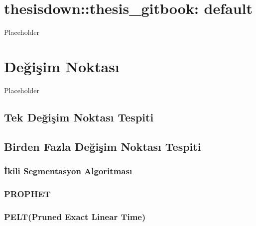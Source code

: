 \documentclass[12pt,twoside]{deuthesis}
\begin{document}
  \listoftables

  \listoffigures



\mainmatter %
\pagestyle{fancyplain} %

\hypertarget{thesisdownthesis_gitbook-default}{%
\chapter{thesisdown::thesis\_gitbook: default}\label{thesisdownthesis_gitbook-default}}

Placeholder

\hypertarget{Bolum2}{%
\chapter{Değişim Noktası}\label{Bolum2}}

Placeholder

\hypertarget{tek-deux11fiux15fim-noktasux131-tespiti}{%
\section{Tek Değişim Noktası Tespiti}\label{tek-deux11fiux15fim-noktasux131-tespiti}}

\hypertarget{birden-fazla-deux11fiux15fim-noktasux131-tespiti}{%
\section{Birden Fazla Değişim Noktası Tespiti}\label{birden-fazla-deux11fiux15fim-noktasux131-tespiti}}

\hypertarget{ikili-segmentasyon-algoritmasux131}{%
\subsection{İkili Segmentasyon Algoritması}\label{ikili-segmentasyon-algoritmasux131}}

\hypertarget{prophet}{%
\subsection{PROPHET}\label{prophet}}

\hypertarget{peltpruned-exact-linear-time}{%
\subsection{PELT(Pruned Exact Linear Time)}\label{peltpruned-exact-linear-time}}
\end{document}

